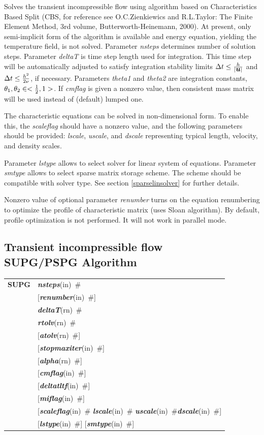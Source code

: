\documentclass[a4paper]{article}
\makeatletter
\newcommand{\mbf}[1]{\mbox{\boldmath$#1$}}
\newcommand{\param}[1]{{\em #1}}
\newcommand{\keywordnotype}[1]{\mbox{{\it{\bf{#1}}}}}
\newcommand{\keyword}[2]{\mbox{{\keywordnotype{#1}\tiny (#2)}}}
\newcommand{\entKeywordInst}[1]{\mbox{{\bf{{#1}}}}}
\newcommand{\field}[2]{\mbox{\keyword{#1}{#2}~\#}}
\newcommand{\optField}[2]{\mbox{[\field{#1}{#2}]}}
\newenvironment{record}[1][]{\begin{tabular}{|ll}}{\end{tabular}\\}
\newcommand{\recentry}[2]{{#1}&{#2}\\}
\newcounter{rcc}
\newenvironment{record}[1][\textwidth]{\setcounter{rcc}{0}\begin{tabular*}{#1}{|ll@{\extracolsep{\fill}}r}}{\end{tabular*}\\}
\newcommand{\recentry}[2]{\ifthenelse{\value{rcc}>0}{&$\backslash$ \\}{\setcounter{rcc}{1}}{#1}&{#2}}
\makeatother
\begin{document}
Solves the transient incompressible flow using algorithm based on
Characteristics Based Split (CBS, for reference see O.C.Zienkiewics
and R.L.Taylor: The Finite Element Method, 3rd volume,
Butterworth-Heinemann, 2000). At present, only semi-implicit form
of the algorithm is available and energy equation, yielding the
temperature field, is not solved.
Parameter \param{nsteps} determines number of solution
steps. Parameter \param{deltaT} is time step length used for
integration. This time step will be automatically adjusted to satisfy
integration stability limits $\Delta t \le {h\over{\vert
  \mbf{u}\vert}}$ and $\Delta t \le {{h^2}\over{2\nu}}$, if necessary. Parameters \param{theta1}
and \param{theta2} are integration constants, $\theta_1, \theta_2 \in <{1\over 2}, 1>$. If \param{cmflag} is given a nonzero value, then
consistent mass matrix will be used instead of (default) lumped one.

The characteristic equations can be solved in non-dimensional form. To
enable this, the \param{scaleflag} should have a nonzero value,
and the following parameters should be provided: \param{lscale},
\param{uscale}, and \param{dscale} representing typical length,
velocity, and density scales.

Parameter \param{lstype} allows to select solver for linear system of
equations. Parameter \param{smtype} allows to select sparse matrix storage
scheme. The scheme should be compatible with solver type. See section
\ref{sparselinsolver} for further details.

Nonzero value of optional parameter \param{renumber} turns on the
equation renumbering to optimize the profile of characteristic matrix
(uses Sloan algorithm). By default, profile optimization is not
performed. It will not work in parallel mode.

\subsection{Transient incompressible flow\\SUPG/PSPG Algorithm}
\label{supgIncomp}
\begin{record}
\recentry{\entKeywordInst{SUPG}}{\field{nsteps}{in}}
\recentry{}{\optField{renumber}{in}}
\recentry{}{\field{deltaT}{rn}} \recentry{}{\field{rtolv}{rn}} \recentry{}{\optField{atolv}{rn}}
\recentry{}{\optField{stopmaxiter}{in}}
\recentry{}{\optField{alpha}{rn}} \recentry{}{\optField{cmflag}{in}} \recentry{}{\optField{deltatltf}{in}}
\recentry{}{\optField{miflag}{in}}
\recentry{}{[\field{scaleflag}{in} \field{lscale}{in} \field{uscale}{in}\field{dscale}{in}]}
\recentry{}{\optField{lstype}{in} \optField{smtype}{in}}
\end{record}
\end{document}
